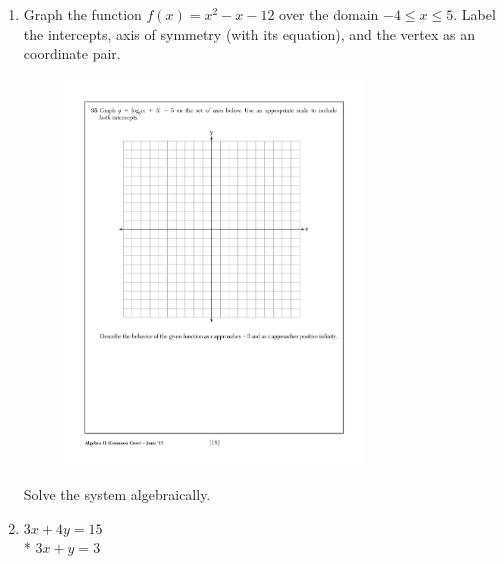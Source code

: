 \documentclass[12pt, twoside]{article}
\begin{document}
\begin{enumerate}
\newpage
\item Graph the function $f(x)=x^2-x-12$ over the domain $-4 \leq x \leq 5$. Label the intercepts, axis of symmetry (with its equation), and the vertex as an coordinate pair.

    \begin{figure}[!ht]
        \centering
        \includegraphics[width=0.75\textwidth]{regents-grid.pdf}
  \end{figure}

Solve the system algebraically.
\item
$3x+4y=15$\\*
$3x+y=3$


\end{enumerate}
\end{document}
